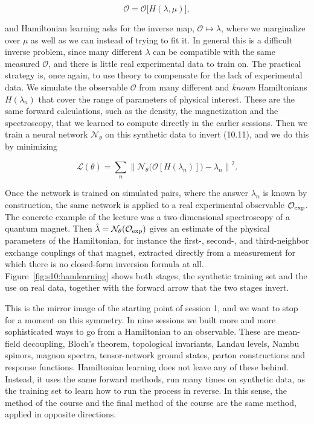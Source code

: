 \begin{equation}
\mathcal{O} = \mathcal{O}\big[H(\lambda,\mu)\big],
\end{equation}

and Hamiltonian learning asks for the inverse map, $\mathcal{O} \mapsto \lambda$, where we
marginalize over $\mu$ as well as we can instead of trying to fit it. In general this is a
difficult inverse problem, since many different $\lambda$ can be compatible with the same measured
$\mathcal{O}$, and there is little real experimental data to train on. The practical strategy is,
once again, to use theory to compensate for the lack of experimental data. We simulate the
observable $\mathcal{O}$ from many different and \emph{known} Hamiltonians $H(\lambda_n)$ that cover
the range of parameters of physical interest. These are the same forward calculations, such as the
density, the magnetization and the spectroscopy, that we learned to compute directly in the earlier
sessions. Then we train a neural network $\mathcal{N}_\theta$ on this synthetic data to invert
(10.11), and we do this by minimizing

\begin{equation}
\mathcal{L}(\theta) = \sum_n \left\| \mathcal{N}_\theta\big(\mathcal{O}[H(\lambda_n)]\big) - \lambda_n \right\|^2.
\end{equation}

Once the network is trained on simulated pairs, where the answer $\lambda_n$ is known by
construction, the same network is applied to a real experimental observable $\mathcal{O}_{\rm
exp}$. The concrete example of the lecture was a two-dimensional spectroscopy of a quantum magnet.
Then $\hat\lambda = \mathcal{N}_\theta(\mathcal{O}_{\rm exp})$ gives an estimate of the physical
parameters of the Hamiltonian, for instance the first-, second-, and third-neighbor exchange
couplings of that magnet, extracted directly from a measurement for which there is no closed-form
inversion formula at all. Figure~\ref{fig:s10:hamlearning} shows both stages, the synthetic training
set and the use on real data, together with the forward arrow that the two stages invert.



This is the mirror image of the starting point of session 1, and we want to stop for a moment on
this symmetry. In nine sessions we built more and more sophisticated ways to go from a Hamiltonian
to an observable. These are mean-field decoupling, Bloch's theorem, topological invariants, Landau
levels, Nambu spinors, magnon spectra, tensor-network ground states, parton constructions and
response functions. Hamiltonian learning does not leave any of these behind. Instead, it uses the
same forward methods, run many times on synthetic data, as the training set to learn how to run the
process in reverse. In this sense, the method of the course and the final method of the course are
the same method, applied in opposite directions.

